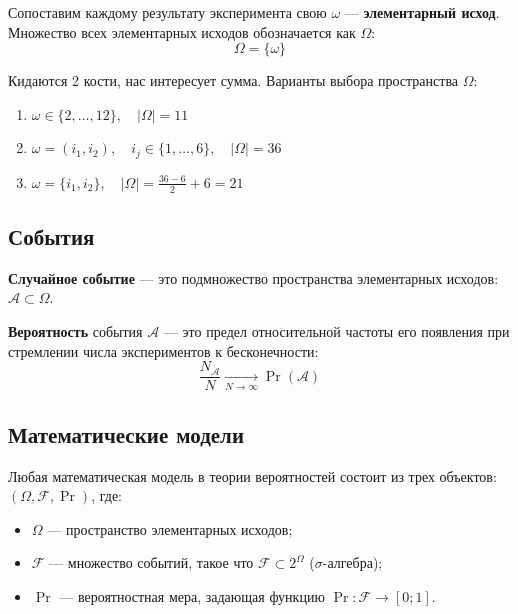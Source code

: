 Сопоставим каждому результату эксперимента свою $\omega$ --- \textbf{элементарный исход}. Множество всех элементарных исходов обозначается как $\Omega$:
\[
    \Omega = \{\omega\} 
\]

\begin{example}
    Кидаются 2 кости, нас интересует сумма. Варианты выбора пространства $\Omega$:
    \begin{enumerate}[label=\arabic*)]
        \item $\omega \in \{2, \dots, 12\}, \quad |\Omega| = 11$
        \item $\omega = (i_1, i_2), \quad i_j \in \{1, \dots, 6\}, \quad |\Omega| = 36$
        \item $\omega = \{i_1, i_2\}, \quad |\Omega| = \frac{36-6}{2} + 6 = 21$
    \end{enumerate}
\end{example}

\subsection{События}

\begin{definition}
    \textbf{Случайное событие} --- это подмножество пространства элементарных исходов: $\mathcal{A} \subset \Omega$.
\end{definition}

\begin{definition}[Вероятность]
    \textbf{Вероятность} события $\mathcal{A}$ --- это предел относительной частоты его появления при стремлении числа экспериментов к бесконечности:
    \[
        \frac{N_{\mathcal{A}}}{N} \xrightarrow[N \to \infty]{} \Pr(\mathcal{A})
    \]
\end{definition}

\subsection{Математические модели}

Любая математическая модель в теории вероятностей состоит из трех объектов: $(\Omega, \mathcal{F}, \Pr)$, где: 
\begin{itemize}
    \item $\Omega$ --- пространство элементарных исходов;
    \item $\mathcal{F}$ --- множество событий, такое что $\mathcal{F} \subset 2^{\Omega}$ ($\sigma$-алгебра);
    \item $\Pr$ --- вероятностная мера, задающая функцию $\Pr \colon \mathcal{F} \to [0; 1]$.
\end{itemize}

